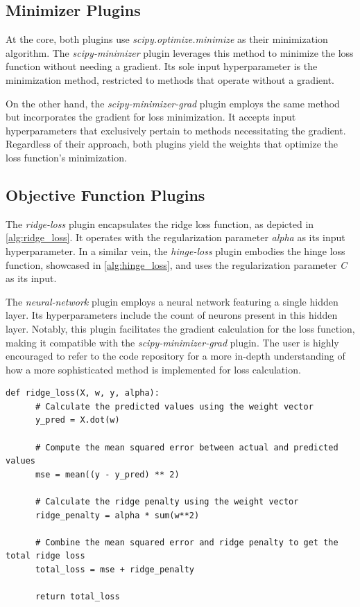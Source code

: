 \documentclass[
  a4paper,  %
  twoside,  %
  bibliography=totoc,
  headsepline,
  cleardoublepage=empty,
  parskip=half,
  draft=false
]{scrbook}
\begin{document}
\subsection{Minimizer Plugins}
\label{sec:minimizerPlugins}

At the core, both plugins use \emph{scipy.optimize.minimize} as their minimization algorithm.
The \emph{scipy-minimizer} plugin leverages this method to minimize the loss function without needing a gradient.
Its sole input hyperparameter is the minimization method, restricted to methods that operate without a gradient.

On the other hand, the \emph{scipy-minimizer-grad} plugin employs the same method but incorporates the gradient for loss minimization.
It accepts input hyperparameters that exclusively pertain to methods necessitating the gradient.
Regardless of their approach, both plugins yield the weights that optimize the loss function's minimization.

\subsection{Objective Function Plugins}
\label{sec:objectiveFunctionPlugins}

The \emph{ridge-loss} plugin encapsulates the ridge loss function, as depicted in \ref{alg:ridge_loss}.
It operates with the regularization parameter \emph{alpha} as its input hyperparameter.
In a similar vein, the \emph{hinge-loss} plugin embodies the hinge loss function, showcased in \ref{alg:hinge_loss}, and uses the regularization parameter \emph{C} as its input.

The \emph{neural-network} plugin employs a neural network featuring a single hidden layer.
Its hyperparameters include the count of neurons present in this hidden layer.
Notably, this plugin facilitates the gradient calculation for the loss function, making it compatible with the \emph{scipy-minimizer-grad} plugin.
The user is highly encouraged to refer to the code repository for a more in-depth understanding of how a more sophisticated method is implemented for loss calculation.


\begin{lstlisting}[caption={Ridge Loss Calculation}, label=alg:ridge_loss]
  def ridge_loss(X, w, y, alpha):
      # Calculate the predicted values using the weight vector
      y_pred = X.dot(w)

      # Compute the mean squared error between actual and predicted values
      mse = mean((y - y_pred) ** 2)

      # Calculate the ridge penalty using the weight vector
      ridge_penalty = alpha * sum(w**2)

      # Combine the mean squared error and ridge penalty to get the total ridge loss
      total_loss = mse + ridge_penalty

      return total_loss
\end{lstlisting}
\end{document}
